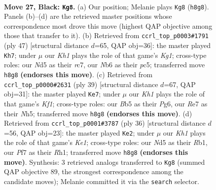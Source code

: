 \documentclass[11pt]{article}
\begin{document}
\clearpage

\begin{figure}[p]\centering
\begin{subfigure}{0.46\textwidth}\centering
\resizebox{\linewidth}{!}{%
\newchessgame
\chessboard[
  setfen={5r1k/4rppp/1n2p3/pbNn2P1/8/1P2P1R1/P5PP/RN1B2K1 b - - 4 27},
  showmover=false,
  pgfstyle=straightmove, color=movearrow, markmove={h8-g8}
]}
\caption{}
\end{subfigure}\hfill
\begin{subfigure}{0.46\textwidth}\centering
\resizebox{\linewidth}{!}{%
\newchessgame
\chessboard[
  setfen={r2r2k1/2R2pp1/4b2p/p1P1p3/2n1P2P/P1P2PN1/5KP1/2B4R b - - 3 24},
  showmover=false,
  pgfstyle=straightmove, color=movearrow, markmove={g8-h7}
]}
\caption{}
\end{subfigure}
\\[4pt]
\begin{subfigure}{0.46\textwidth}\centering
\resizebox{\linewidth}{!}{%
\newchessgame
\chessboard[
  setfen={2rr1k2/1p3p2/p2p2pp/4n2n/P3P2P/1P2RP2/1KPB4/5B1R b - - 1 20},
  showmover=false,
  pgfstyle=straightmove, color=movearrow, markmove={f8-e7}
]}
\caption{}
\end{subfigure}\hfill
\begin{subfigure}{0.46\textwidth}\centering
\resizebox{\linewidth}{!}{%
\newchessgame
\chessboard[
  setfen={r4knr/1p1b1p1p/p3p1p1/n1P5/4P3/3BN3/P2N1PPP/1R2K2R w K - 2 19},
  showmover=false,
  pgfstyle=straightmove, color=movearrow, markmove={e1-e2}
]}
\caption{}
\end{subfigure}
\caption{\textbf{Move 27, Black: \texttt{Kg8}.} (a) Our position; Melanie plays \texttt{Kg8} (\texttt{h8g8}). Panels (b)--(d) are the retrieved master positions whose correspondence most drove this move (highest QAP objective among those that transfer to it). (b) Retrieved from \texttt{ccrl\_top\_p0003\#1791} (ply 47) [structural distance $d$=65, QAP obj=36]: the master played \texttt{Kh7}; under $\mu$ our \emph{Kh1} plays the role of that game's \emph{Kg1}; cross-type roles: our \emph{N}d5 as their \emph{r}c7, our \emph{N}b6 as their \emph{p}c5; transferred move \texttt{h8g8} \textbf{(endorses this move)}. (c) Retrieved from \texttt{ccrl\_top\_p0000\#2631} (ply 39) [structural distance $d$=67, QAP obj=31]: the master played \texttt{Ke7}; under $\mu$ our \emph{Kh1} plays the role of that game's \emph{Kf1}; cross-type roles: our \emph{B}b5 as their \emph{P}g6, our \emph{R}e7 as their \emph{N}h5; transferred move \texttt{h8g8} \textbf{(endorses this move)}. (d) Retrieved from \texttt{ccrl\_top\_p0001\#3787} (ply 36) [structural distance $d$=56, QAP obj=23]: the master played \texttt{Ke2}; under $\mu$ our \emph{Kh1} plays the role of that game's \emph{Ke1}; cross-type roles: our \emph{N}d5 as their \emph{R}b1, our \emph{P}f7 as their \emph{R}h1; transferred move \texttt{h8g8} \textbf{(endorses this move)}. Synthesis: 3 retrieved analogs transferred to \texttt{Kg8} (summed QAP objective 89, the strongest correspondence among the candidate moves); Melanie committed it via the \texttt{search} selector.}
\label{fig:thought-m53}
\end{figure}
\end{document}
